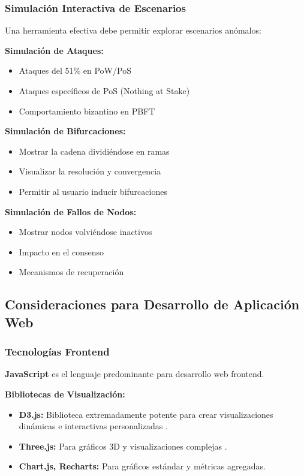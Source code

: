 \documentclass[spanish,12pt,letterpaper]{report}
\begin{document}
\subsubsection{Simulación Interactiva de Escenarios}

Una herramienta efectiva debe permitir explorar escenarios anómalos:

\textbf{Simulación de Ataques:}
\begin{itemize}
    \item Ataques del 51\% en PoW/PoS
    \item Ataques específicos de PoS (Nothing at Stake)
    \item Comportamiento bizantino en PBFT
\end{itemize}

\textbf{Simulación de Bifurcaciones:}
\begin{itemize}
    \item Mostrar la cadena dividiéndose en ramas
    \item Visualizar la resolución y convergencia
    \item Permitir al usuario inducir bifurcaciones
\end{itemize}

\textbf{Simulación de Fallos de Nodos:}
\begin{itemize}
    \item Mostrar nodos volviéndose inactivos
    \item Impacto en el consenso
    \item Mecanismos de recuperación
\end{itemize}

\subsection{Consideraciones para Desarrollo de Aplicación Web}

\subsubsection{Tecnologías Frontend}

\textbf{JavaScript} es el lenguaje predominante para desarrollo web frontend.

\textbf{Bibliotecas de Visualización:}
\begin{itemize}
    \item \textbf{D3.js:} Biblioteca extremadamente potente para crear visualizaciones dinámicas e interactivas personalizadas \parencite{d3js2025}.
    \item \textbf{Three.js:} Para gráficos 3D y visualizaciones complejas \parencite{threejs2025}.

    \item \textbf{Chart.js, Recharts:} Para gráficos estándar y métricas agregadas.
\end{itemize}
\end{document}
